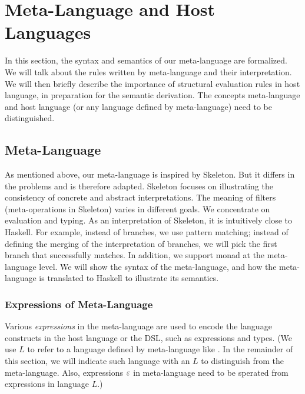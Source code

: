 \section{Meta-Language and Host Languages}\label{sec:host}

In this section, the syntax and semantics of our meta-language are formalized.
We will talk about the rules written by meta-language and their interpretation.
We will then briefly describe the importance of structural evaluation rules in host language,
 in preparation for the semantic derivation.
The concepts meta-language and host language (or any language defined by meta-language) need to be distinguished.

\subsection{Meta-Language}\label{sec:meta}

As mentioned above, our meta-language is inspired by Skeleton.
But it differs in the problems and is therefore adapted.
Skeleton focuses on illustrating the consistency of concrete and abstract interpretations.
The meaning of filters (meta-operations in Skeleton) varies in different goals.
We concentrate on evaluation and typing.
As an interpretation of Skeleton, it is intuitively close to Haskell.
For example, instead of branches, we use pattern matching;
 instead of defining the merging of the interpretation of branches,
 we will pick the first branch that successfully matches.
In addition, we support monad at the meta-language level.
We will show the syntax of the meta-language, 
 and how the meta-language is translated to Haskell to illustrate its semantics.

\subsubsection{Expressions of Meta-Language}
Various \textit{expressions} in the meta-language are used to encode the language constructs in the host language or the DSL, such as expressions and types.
(We use $L$ to refer to a language defined by meta-language like \STLC.
In the remainder of this section, we will indicate such language with an $L$ to distinguish from the meta-language.
Also, expressions $\varepsilon$ in meta-language need to be sperated from expressions in language $L$.)

